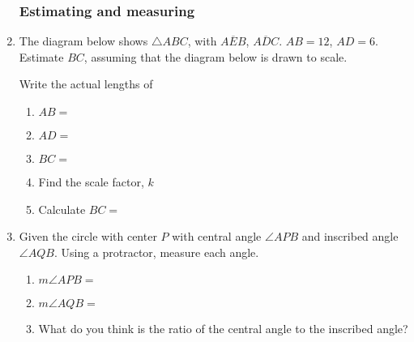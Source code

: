 \documentclass[12pt, twoside]{article}
\begin{document}
\begin{enumerate}
\newpage
\subsubsection*{Estimating and measuring}

  \item The diagram below shows $\triangle ABC$, with $\overline{AEB}$, $\overline{ADC}$. $AB=12$, $AD=6$. Estimate $BC$, assuming that the diagram below is drawn to scale.
  \begin{multicols}{2}
    Write the actual lengths of 
    \begin{enumerate}
      \item $AB=$ \vspace{0.7cm}
      \item $AD=$ \vspace{0.7cm}
      \item $BC=$  \vspace{0.7cm}
      \item Find the scale factor, $k$ \vspace{1.2cm}
      \item Calculate $BC=$
    \end{enumerate}
    \end{multicols}\vspace{2cm}

  \item Given the circle with center $P$ with central angle $\angle APB$ and inscribed angle $\angle AQB$. Using a protractor, measure each angle.
  \begin{multicols}{2}
    \raggedcolumns
    \begin{enumerate}
      \item $m\angle APB=$ \vspace{0.7cm}
      \item $m\angle AQB=$ \vspace{0.7cm}
      \item What do you think is the ratio of the central angle to the inscribed angle?
    \end{enumerate}
  \end{multicols}


\end{enumerate}
\end{document}
